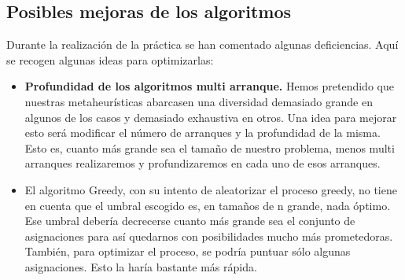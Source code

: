 \subsection{Posibles mejoras de los algoritmos}

Durante la realización de la práctica se han comentado algunas deficiencias. Aquí se recogen algunas ideas para optimizarlas:

\begin{itemize}
	\item \textbf{Profundidad de los algoritmos multi arranque.} Hemos pretendido que nuestras metaheurísticas abarcasen una diversidad demasiado grande en algunos de los casos y demasiado exhaustiva en otros. Una idea para mejorar esto será modificar el número de arranques y la profundidad de la misma. Esto es, cuanto más grande sea el tamaño de nuestro problema, menos multi arranques realizaremos y profundizaremos en cada uno de esos arranques.
	
	\item El algoritmo Greedy, con su intento de aleatorizar el proceso greedy, no tiene en cuenta que el umbral escogido es, en tamaños de n grande, nada óptimo. Ese umbral debería decrecerse cuanto más grande sea el conjunto de asignaciones para así quedarnos con posibilidades mucho más prometedoras. También, para optimizar el proceso, se podría puntuar sólo algunas asignaciones. Esto la haría bastante más rápida.
	
\end{itemize}







